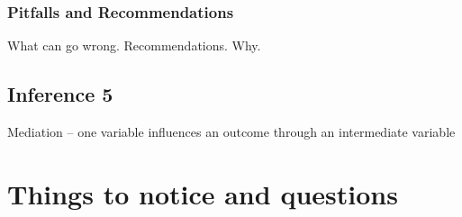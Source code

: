 \documentclass[english,,man]{apa6}
\theoremstyle{definition}
\theoremstyle{definition}
\theoremstyle{definition}
\theoremstyle{remark}
\begin{document}
\hypertarget{pitfalls-and-recommendations-10}{%
\subsubsection{Pitfalls and
Recommendations}\label{pitfalls-and-recommendations-10}}

What can go wrong. Recommendations. Why.

\hypertarget{inference-5-1}{%
\subsection{Inference 5}\label{inference-5-1}}

Mediation -- one variable influences an outcome through an intermediate
variable

\hypertarget{things-to-notice-and-questions}{%
\section{Things to notice and
questions}\label{things-to-notice-and-questions}}
\end{document}
